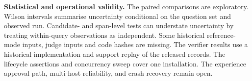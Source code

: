 \noindent\textbf{Statistical and operational validity.} The paired
comparisons are exploratory. Wilson intervals summarise uncertainty
conditional on the question set and observed run. Candidate- and span-level
tests can understate uncertainty by treating within-query observations as
independent. Some historical reference-mode inputs, judge inputs and code
hashes are missing. The verifier results use a historical implementation
and support replay of the released records. The lifecycle assertions and
concurrency sweep cover one installation. The experience approval path,
multi-host reliability, and crash recovery remain open.
